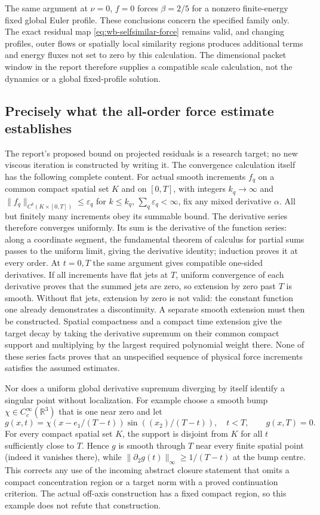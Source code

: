 The same argument at $\nu=0$, $f=0$ forces $\beta=2/5$ for a
nonzero finite-energy fixed global Euler profile. These conclusions
concern the specified family only. The exact residual map
\eqref{eq:wb-selfsimilar-force} remains valid, and changing profiles,
outer flows or spatially local similarity regions produces additional
terms and energy fluxes not set to zero by this calculation. The
dimensional packet window in the report therefore supplies a compatible
scale calculation, not the dynamics or a global fixed-profile solution.

\subsection{Precisely what the all-order force estimate establishes}

The report's proposed bound on projected residuals is a research target;
no new viscous iteration is constructed by writing it. The convergence
calculation itself has the following complete content. For actual smooth
increments $f_q$ on a common compact spatial set $K$ and on $[0,T]$,
with integers $k_q\to\infty$ and
$\|f_q\|_{C^k(K\times[0,T])}\leq\varepsilon_q$ for
$k\leq k_q$, $\sum_q\varepsilon_q<\infty$, fix any mixed
derivative $\alpha$. All but finitely many increments obey its
summable bound. The derivative series therefore converges uniformly.
Its sum is the derivative of the function series: along a coordinate
segment, the fundamental theorem of calculus for partial sums passes
to the uniform limit, giving the derivative identity; induction proves
it at every order. At $t=0,T$ the same argument gives compatible
one-sided derivatives. If all increments have flat jets at $T$,
uniform convergence of each derivative proves that the summed jets
are zero, so extension by zero past $T$ is smooth. Without flat jets,
extension by zero is not valid: the constant function one already
demonstrates a discontinuity. A separate smooth extension must then
be constructed. Spatial compactness and a compact time extension give
the target decay by taking the derivative supremum on their common
compact support and multiplying by the largest required polynomial
weight there. None of these series facts proves that an unspecified
sequence of physical force increments satisfies the assumed estimates.

Nor does a uniform global derivative supremum diverging by itself
identify a singular point without localization. For example choose a
smooth bump $\chi\in C_c^\infty(\mathbb R^3)$ that is one near zero
and let
\[
 g(x,t)=\chi(x-e_1/(T-t))\sin((x_2)/(T-t)),\quad t<T,
 \qquad g(x,T)=0.
\]
For every compact spatial set $K$, the support is disjoint from $K$
for all $t$ sufficiently close to $T$. Hence $g$ is smooth through
$T$ near every finite spatial point (indeed it vanishes there), while
$\|\partial_2g(t)\|_\infty\geq1/(T-t)$ at the bump centre.
This corrects any use of the incoming abstract closure statement that
omits a compact concentration region or a target norm with a proved
continuation criterion. The actual off-axis construction has a fixed
compact region, so this example does not refute that construction.
